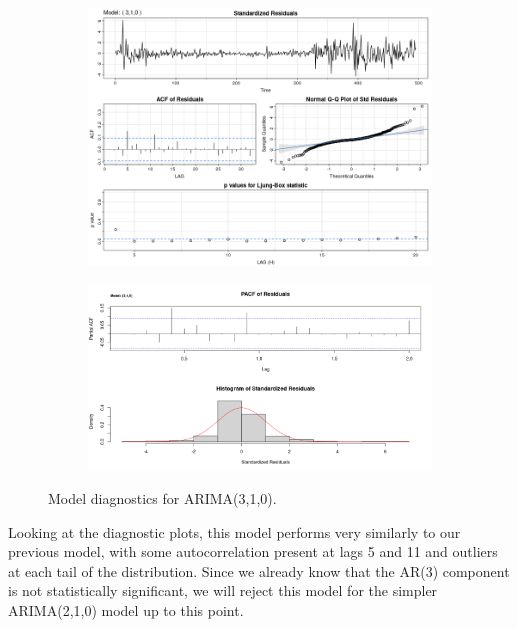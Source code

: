 \documentclass[12pt]{article}
\begin{document}
\begin{figure}[h!]
\centering

\begin{subfigure}[b]{0.6\textwidth}
\centering
\includegraphics[width=1\textwidth]{images/arima_310.png}
\label{fig:sub1}
\end{subfigure}

\begin{subfigure}[b]{0.6\textwidth}
\centering
\includegraphics[width=1\textwidth]{images/arima_310_examine.png}
\label{fig:sub2}
\end{subfigure}

\caption{Model diagnostics for ARIMA(3,1,0).}
\label{fig:test}
\end{figure}



Looking at the diagnostic plots, this model performs very similarly to our previous model, with some autocorrelation present at lags 5 and 11 and outliers at each tail of the distribution. Since we already know that the AR(3) component is not statistically significant, we will reject this model for the simpler ARIMA(2,1,0) model up to this point.
\end{document}
